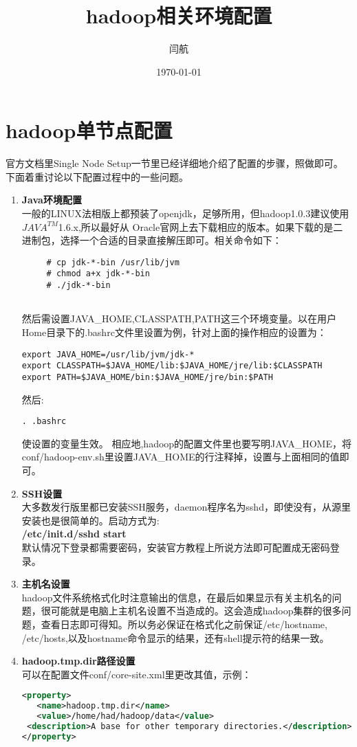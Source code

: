 \documentclass[11pt]{article}
\title{\textbf{hadoop相关环境配置}}
\author{闫航}
\date{\today}
\begin{document}
\maketitle
\tableofcontents

\section{hadoop单节点配置}
官方文档里Single Node Setup一节里已经详细地介绍了配置的步骤，照做即可。下面着重讨论以下配置过程中的一些问题。
\begin{enumerate}
\item{\textbf{Java环境配置}} \\
一般的LINUX法相版上都预装了openjdk，足够所用，但hadoop1.0.3建议使用$JAVA^{TM}$1.6.x,所以最好从
Oracle官网上去下载相应的版本。如果下载的是二进制包，选择一个合适的目录直接解压即可。相关命令如下：\\
\begin{lstlisting}
     # cp jdk-*-bin /usr/lib/jvm 
     # chmod a+x jdk-*-bin 
     # ./jdk-*-bin 
     
\end{lstlisting}	
然后需设置JAVA\_HOME,CLASSPATH,PATH这三个环境变量。以在用户Home目录下的.bashrc文件里设置为例，针对上面的操作相应的设置为： \\
\begin{lstlisting}
export JAVA_HOME=/usr/lib/jvm/jdk-*
export CLASSPATH=$JAVA_HOME/lib:$JAVA_HOME/jre/lib:$CLASSPATH
export PATH=$JAVA_HOME/bin:$JAVA_HOME/jre/bin:$PATH
\end{lstlisting}
然后:\\
\begin{lstlisting}
. .bashrc
\end{lstlisting}
使设置的变量生效。
相应地,hadoop的配置文件里也要写明JAVA\_HOME，将conf/hadoop-env.sh里设置JAVA\_HOME的行注释掉，设置与上面相同的值即可。
\item{\textbf{SSH设置}} \\
大多数发行版里都已安装SSH服务，daemon程序名为sshd，即使没有，从源里安装也是很简单的。启动方式为:\\
	\textbf{/etc/init.d/sshd start} \\
默认情况下登录都需要密码，安装官方教程上所说方法即可配置成无密码登录。
\item{\textbf{主机名设置}} \\
hadoop文件系统格式化时注意输出的信息，在最后如果显示有关主机名的问题，很可能就是电脑上主机名设置不当造成的。这会造成hadoop集群的很多问题，查看日志即可得知。所以务必保证在格式化之前保证/etc/hostname,
/etc/hosts,以及hostname命令显示的结果，还有shell提示符的结果一致。
\item{\textbf{hadoop.tmp.dir路径设置}} \\
可以在配置文件conf/core-site.xml里更改其值，示例：\\
\begin{lstlisting}[language=XML]
<property>  
   <name>hadoop.tmp.dir</name>  
   <value>/home/had/hadoop/data</value>  
 <description>A base for other temporary directories.</description>
</property>
\end{lstlisting}
\end{enumerate}
\end{document}

